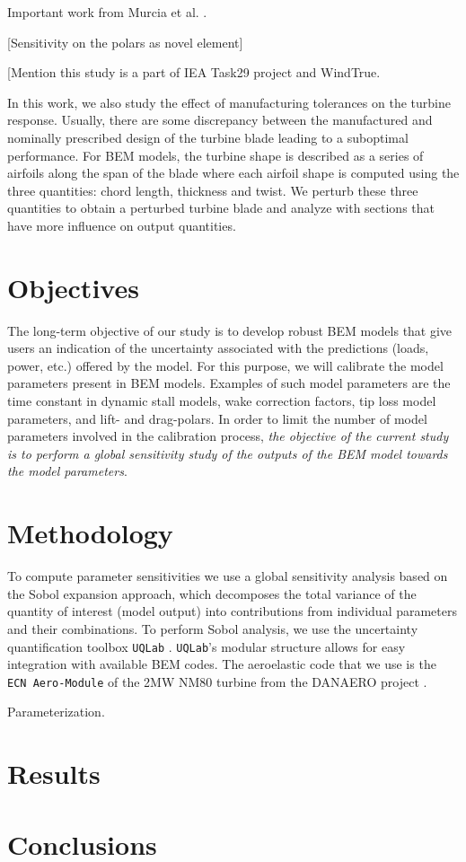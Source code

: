 \documentclass[11pt]{article}
\begin{document}
Important work from Murcia et al. \cite{Murcia2018}.

[Sensitivity on the polars as novel element]

[Mention this study is a part of IEA Task29 project and WindTrue.

In this work, we also study the effect of manufacturing tolerances on the turbine response. Usually, there are some discrepancy between the  manufactured and nominally prescribed design of the turbine blade leading to a suboptimal performance. For BEM models, the turbine shape is described as a series of airfoils along the span of the blade where each airfoil shape is computed using the three quantities: chord length, thickness and twist. We perturb these three quantities to obtain a perturbed turbine blade and analyze with sections that have more influence on output quantities. 



\section{Objectives}
The long-term objective of our study is to develop robust BEM models that give users an indication of the uncertainty associated with the predictions (loads, power, etc.) offered by the model. For this purpose, we will calibrate the model parameters present in BEM models. Examples of such model parameters are the time constant in dynamic stall models, wake correction factors, tip loss model parameters, and lift- and drag-polars. In order to limit the number of model parameters involved in the calibration process, \textit{the objective of the current study is to perform a global sensitivity study of the outputs of the BEM model towards the model parameters}.

\section{Methodology}
To compute parameter sensitivities we use a global sensitivity analysis based on the Sobol expansion approach, which decomposes the total variance of the quantity of interest (model output) into contributions from individual parameters and their combinations. To perform Sobol analysis, we use the uncertainty quantification toolbox \texttt{UQLab} \cite{uqlab}. \texttt{UQLab}'s modular structure allows for easy integration with available BEM codes. The aeroelastic code that we use is the \texttt{ECN Aero-Module} \cite{Boorsma2012} of the 2MW NM80 turbine from the DANAERO project \cite{Troldborg2013}.

Parameterization.

\section{Results}


\section{Conclusions}




\end{document}
